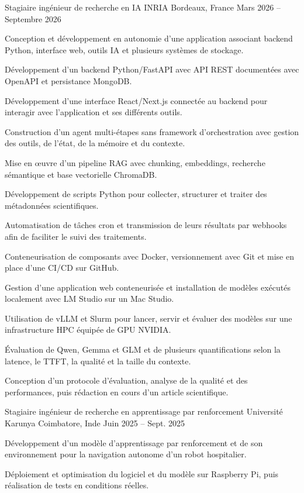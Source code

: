 
\begin{cventries}
  \cventry
    {Stagiaire ingénieur de recherche en IA}
    {INRIA}
    {Bordeaux, France}
    {Mars 2026 -- Septembre 2026}
    {
      \begin{cvitems}
        \item {Conception et développement en autonomie d’une application associant backend Python, interface web, outils IA et plusieurs systèmes de stockage.}
        \item {Développement d’un backend Python/FastAPI avec API REST documentées avec OpenAPI et persistance MongoDB.}
        \item {Développement d’une interface React/Next.js connectée au backend pour interagir avec l’application et ses différents outils.}
        \item {Construction d’un agent multi-étapes sans framework d’orchestration avec gestion des outils, de l’état, de la mémoire et du contexte.}
        \item {Mise en œuvre d’un pipeline RAG avec chunking, embeddings, recherche sémantique et base vectorielle ChromaDB.}
        \item {Développement de scripts Python pour collecter, structurer et traiter des métadonnées scientifiques.}
        \item {Automatisation de tâches cron et transmission de leurs résultats par webhooks afin de faciliter le suivi des traitements.}
        \item {Conteneurisation de composants avec Docker, versionnement avec Git et mise en place d’une CI/CD sur GitHub.}
        \item {Gestion d’une application web conteneurisée et installation de modèles exécutés localement avec LM Studio sur un Mac Studio.}
        \item {Utilisation de vLLM et Slurm pour lancer, servir et évaluer des modèles sur une infrastructure HPC équipée de GPU NVIDIA.}
        \item {Évaluation de Qwen, Gemma et GLM et de plusieurs quantifications selon la latence, le TTFT, la qualité et la taille du contexte.}
        \item {Conception d’un protocole d’évaluation, analyse de la qualité et des performances, puis rédaction en cours d’un article scientifique.}
      \end{cvitems}
    }

  \cventry
    {Stagiaire ingénieur de recherche en apprentissage par renforcement}
    {Université Karunya}
    {Coimbatore, Inde}
    {Juin 2025 -- Sept. 2025}
    {
      \begin{cvitems}
        \item {Développement d’un modèle d’apprentissage par renforcement et de son environnement pour la navigation autonome d’un robot hospitalier.}
        \item {Déploiement et optimisation du logiciel et du modèle sur Raspberry Pi, puis réalisation de tests en conditions réelles.}
      \end{cvitems}
    }
\end{cventries}
